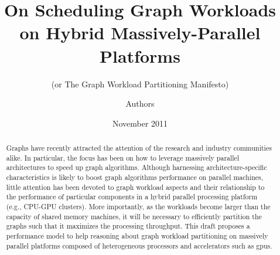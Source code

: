 \documentclass{acm_proc_article-sp}[10pt]
\title{On Scheduling Graph Workloads on Hybrid Massively-Parallel Platforms}
\subtitle{(or The Graph Workload Partitioning Manifesto)}
\author{
\alignauthor 
Authors
}
\date{November 2011}
\newcommand{\comment}[2]{\begin{center}\colorbox{#1}{\parbox{0.85\linewidth}{\textit{{#2}}}}\end{center}}
\newcommand{\abdullah}[1]{\comment{orange}{{Abdullah: #1}}}
\newcommand{\lauro}[1]{\comment{midblue}{{Lauro: #1}}}
\newcommand{\elizeu}[1]{\comment{lightgreen}{{Elizeu: #1}}}
\begin{document}
\maketitle


\begin{abstract}
Graphs have recently attracted the attention of the research and industry communities alike. In particular, the focus has been on how to leverage massively parallel architectures to speed up graph algorithms. Although harnessing architecture-specific characteristics is likely to boost graph algorithms performance on parallel machines, little attention has been devoted to graph workload aspects and their relationship to the performance of particular components in a hybrid parallel processing platform (e.g., CPU-GPU clusters). More importantly, as the workloads become larger than the capacity of shared memory machines, it will be necessary to efficiently partition the graphs such that it maximizes the processing throughput. This draft proposes a performance model to help reasoning about graph workload partitioning on massively parallel platforms composed of heterogeneous processors and accelerators such as {\sc gpu}s.
\end{abstract}









\balancecolumns
\end{document}
